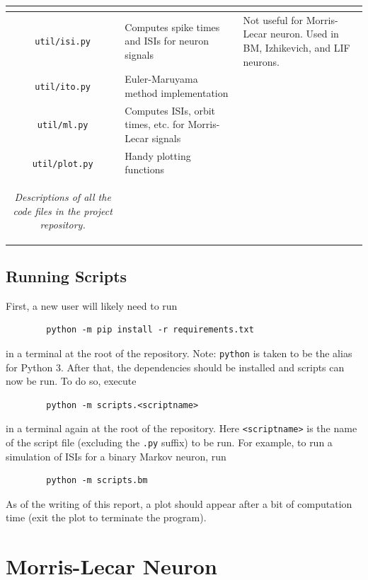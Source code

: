 \documentclass[letterpaper,12pt]{article}
\numberwithin{table}{section}
\numberwithin{figure}{section}
\numberwithin{equation}{section}
\newcommand{\ccaption}[1]{\caption{\textit{#1}}}
\begin{document}
\begin{flushleft}
\begin{center}
\begin{tabularx}{\linewidth}{ | c | Y | X | }
{            } & \\
            \hline
            \texttt{util/isi.py} & Computes spike times and ISIs for neuron signals & Not useful for Morris-Lecar neuron. Used in BM, Izhikevich, and LIF neurons. \\
            \hline
            \texttt{util/ito.py} & Euler-Maruyama method implementation & \\
            \hline
            \texttt{util/ml.py} & Computes ISIs, orbit times, etc. for Morris-Lecar signals & \\
            \hline
            \texttt{util/plot.py} & Handy plotting functions & \\
            \hline

            \captionsetup{width=\linewidth}
            \ccaption{Descriptions of all the code files in the project repository.}
            \label{tab:code-files}

        \end{tabularx}
    
    \end{center}

    \subsection{Running Scripts}
    First, a new user will likely need to run
    \begin{lstlisting}
        python -m pip install -r requirements.txt
    \end{lstlisting}
    in a terminal at the root of the repository. Note: \texttt{python} is taken to be the alias for Python 3. After that, the dependencies should be installed and scripts can now be run. To do so, execute
    \begin{lstlisting}
        python -m scripts.<scriptname>
    \end{lstlisting}
    in a terminal again at the root of the repository. Here \texttt{<scriptname>} is the name of the script file (excluding the \texttt{.py} suffix) to be run. For example, to run a simulation of ISIs for a binary Markov neuron, run
    \begin{lstlisting}
        python -m scripts.bm
    \end{lstlisting}
    As of the writing of this report, a plot should appear after a bit of computation time (exit the plot to terminate the program).

    \pagebreak

    \section{Morris-Lecar Neuron}
    

\end{flushleft}
\end{document}
